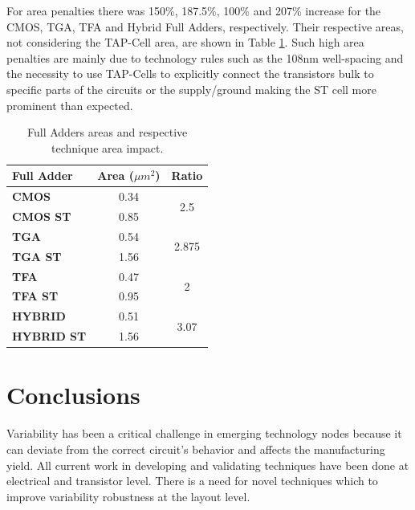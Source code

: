 \documentclass[ecp,tc, english]{iiufrgs}
\begin{document}
For area penalties there was 150\%, 187.5\%, 100\% and 207\% increase for the CMOS, TGA, TFA and Hybrid Full Adders, respectively. Their respective areas, not considering the TAP-Cell area, are shown in Table \ref{penalties}. Such high area penalties are mainly due to technology rules such as the 108nm well-spacing and the necessity to use TAP-Cells to explicitly connect the transistors bulk to specific parts of the circuits or the supply/ground making the ST cell more prominent than expected.

\begin{table}[H]
\centering
\caption{Full Adders areas and respective technique area impact.}
\label{penalties}
\begin{tabular}{|l|c|c|}
\hline
\textbf{Full Adder} & \textbf{Area (${\mu m}^2$)}    & \textbf{Ratio}         \\ \hline
\textbf{CMOS}       & 0.34             & \multirow{2}{*}{2.5}   \\ \cline{1-2}
\textbf{CMOS ST}    & 0.85             &                        \\ \hline
\textbf{TGA}        & 0.54             & \multirow{2}{*}{2.875} \\ \cline{1-2}
\textbf{TGA ST}     & 1.56             &                        \\ \hline
\textbf{TFA}        & 0.47             & \multirow{2}{*}{2}     \\ \cline{1-2}
\textbf{TFA ST}     & 0.95             &                        \\ \hline
\textbf{HYBRID}     & 0.51             & \multirow{2}{*}{3.07}  \\ \cline{1-2}
\textbf{HYBRID ST}  & 1.56             &                        \\ \hline
\end{tabular}
\end{table}

\chapter{Conclusions}

Variability has been a critical challenge in emerging technology nodes because it can deviate from the correct circuit's behavior and affects the manufacturing yield. All current work in developing and validating techniques have been done at electrical and transistor level. There is a need for novel techniques which to improve variability robustness at the layout level.
\end{document}
